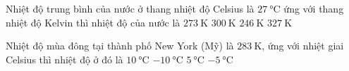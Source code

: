 \begin{ex}
Nhiệt độ trung bình của nước ở thang nhiệt độ Celsius là $\SI{27}{\celsius}$ ứng với thang nhiệt độ Kelvin thì nhiệt độ của nước là
	\choice
	{$\SI{273}{\kelvin}$}
	{\True $\SI{300}{\kelvin}$}
	{$\SI{246}{\kelvin}$}
	{$\SI{327}{\kelvin}$}
\end{ex}
\begin{ex}
Nhiệt độ mùa đông tại thành phố New York (Mỹ) là $\SI{283}{\kelvin}$, ứng với nhiệt giai Celsius thì nhiệt độ ở đó là
	\choice
	{\True $\SI{10}{\celsius}$}
	{$\SI{-10}{\celsius}$}
	{$\SI{5}{\celsius}$}
	{$\SI{-5}{\celsius}$}
\end{ex}



